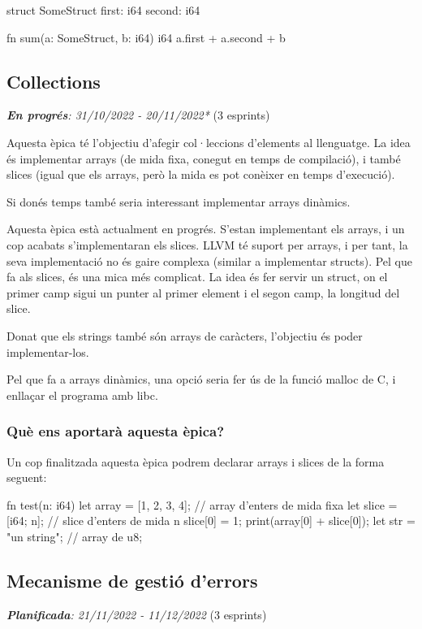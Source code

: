 ﻿\documentclass{article}
\begin{document}
\begin{code}
struct SomeStruct {
    first: i64
    second: i64
}

fn sum(a: SomeStruct, b: i64) i64 {
    a.first + a.second + b
}
\end{code}

\subsection{Collections}
\textit{\textbf{En progrés}: 31/10/2022 - 20/11/2022*} (3 esprints)

Aquesta èpica té l'objectiu d'afegir col·leccions d'elements al llenguatge. La idea
és implementar arrays (de mida fixa, conegut en temps de compilació), i també
slices (igual que els arrays, però la mida es pot conèixer en temps d'execució).

Si donés temps també seria interessant implementar arrays dinàmics.

Aquesta èpica està actualment en progrés. S'estan implementant els arrays, i un
cop acabats s'implementaran els slices. LLVM té suport per arrays, i per tant,
la seva implementació no és gaire complexa (similar a implementar structs). Pel
que fa als slices, és una mica més complicat. La idea és fer servir un struct,
on el primer camp sigui un punter al primer element i el segon camp, la longitud
del slice.

Donat que els strings també són arrays de caràcters, l'objectiu és poder 
implementar-los.

Pel que fa a arrays dinàmics, una opció seria fer ús de la funció malloc de C, i
enllaçar el programa amb libc.

\subsubsection{Què ens aportarà aquesta èpica?}
Un cop finalitzada aquesta èpica podrem declarar arrays i slices de la forma seguent:

\begin{code}
fn test(n: i64) {
    let array = [1, 2, 3, 4]; // array d'enters de mida fixa
    let slice = [i64; n]; // slice d'enters de mida n
    slice[0] = 1;
    print(array[0] + slice[0]);
    let str = "un string"; // array de u8;
}
\end{code}

\subsection{Mecanisme de gestió d'errors}
\textit{\textbf{Planificada}: 21/11/2022 - 11/12/2022} (3 esprints)
\end{document}
